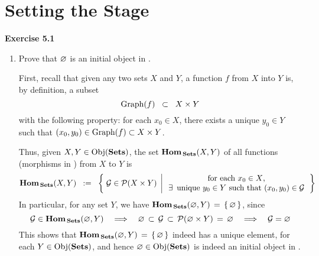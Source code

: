 

\section{Setting the Stage}
\setcounter{theorem}{0}
\setcounter{equation}{0}


\renewcommand{\theenumi}{\roman{enumi}}
\renewcommand{\labelenumi}{\textnormal{(\theenumi)}$\;\;$}


\noindent
\textbf{Exercise 5.1}
\begin{enumerate}
\item
	Prove that $\varnothing$ is an initial object in \Sets.
	
	\proof
	First, recall that given any two sets $X$ and $Y$, a function $f$ from $X$ into $Y$ is,
	by definition, a subset
	\begin{equation*}
	\textnormal{Graph}(f) \;\; \subset \;\; X \times Y
	\end{equation*}
	with the following property:
	for each $x_{0} \in X$, there {\color{red}exists} a {\color{red}unique} $y_{0} \in Y$ such that
	$(x_{0},y_{0}) \in \textnormal{Graph}(f) \subset X \times Y$.
	
	Thus, given $X, Y \in \textnormal{Obj}(\textbf{Sets})$, the set $\textbf{Hom}_{\,\textbf{Sets}}(X,Y)$ of all
	functions (morphisms in \Sets) from $X$ to $Y$ is
	\begin{equation*}
	\textbf{Hom}_{\,\textbf{Sets}}(X,Y)
	\;\; := \;\;
		\left\{\;
			\mathcal{G} \in \mathcal{P}(X \times Y)
			\;\left\vert\,
			\begin{array}{c}
				\textnormal{for each $x_{0} \in X$,}
				\\
				\textnormal{$\exists$\, unique $y_{0} \in Y$ such that $(x_{0},y_{0}) \in \mathcal{G}$}
			\end{array}
			\right.
		\right\}
	\end{equation*}
	In particular, for any set $Y$, we have $\textbf{Hom}_{\,\textbf{Sets}}(\varnothing,Y) \,=\, \left\{\,\varnothing\,\right\}$,
	since
	\begin{equation*}
	\mathcal{G} \in \textbf{Hom}_{\,\textbf{Sets}}(\varnothing,Y)
	\quad\Longrightarrow\quad
		\varnothing \,\subset\, \mathcal{G} \,\subset\, \mathcal{P}(\varnothing \times Y) \,=\, \varnothing
	\quad\Longrightarrow\quad
		\mathcal{G} = \varnothing
	\end{equation*}
	This shows that $\textbf{Hom}_{\,\textbf{Sets}}(\varnothing,Y) \,=\, \left\{\,\varnothing\,\right\}$ indeed
	has a unique element, for each $Y \in \textnormal{Obj}(\textbf{Sets})$, and hence $\varnothing \in \textnormal{Obj}(\textbf{Sets})$ is indeed
	an initial object in \Sets.


\end{enumerate}
